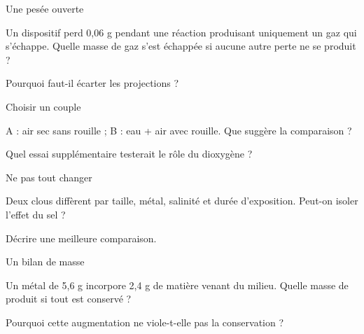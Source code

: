 \par\noindent\begin{minipage}{\linewidth}
\begin{exercice}[2]{Une pesée ouverte}
\begin{questions}
\item Un dispositif perd 0,06 g pendant une réaction produisant uniquement un gaz qui s’échappe. Quelle masse de gaz s’est échappée si aucune autre perte ne se produit ?
\item Pourquoi faut-il écarter les projections ?
\end{questions}
\end{exercice}
\end{minipage}
\par\noindent\begin{minipage}{\linewidth}
\begin{exercice}[2]{Choisir un couple}
\begin{questions}
\item A : air sec sans rouille ; B : eau + air avec rouille. Que suggère la comparaison ?
\item Quel essai supplémentaire testerait le rôle du dioxygène ?
\end{questions}
\end{exercice}
\end{minipage}
\par\noindent\begin{minipage}{\linewidth}
\begin{exercice}[2]{Ne pas tout changer}
\begin{questions}
\item Deux clous diffèrent par taille, métal, salinité et durée d’exposition. Peut-on isoler l’effet du sel ?
\item Décrire une meilleure comparaison.
\end{questions}
\end{exercice}
\end{minipage}
\clearpage{}
\par\noindent\begin{minipage}{\linewidth}
\begin{exercice}[3]{Un bilan de masse}
\begin{questions}
\item Un métal de 5,6 g incorpore 2,4 g de matière venant du milieu. Quelle masse de produit si tout est conservé ?
\item Pourquoi cette augmentation ne viole-t-elle pas la conservation ?
\end{questions}
\end{exercice}
\end{minipage}
